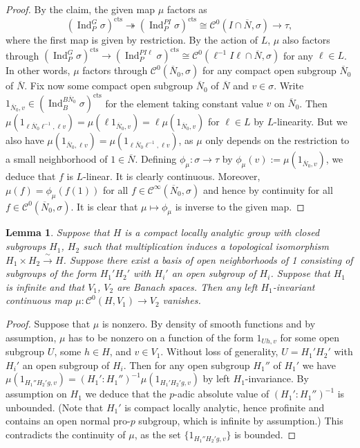 \documentclass[a4paper]{amsart}
\numberwithin{equation}{section}
\newtheorem{lem}[thm]{Lemma}
\theoremstyle{remark}
\theoremstyle{definition}
\DeclareMathOperator{\Ind}{Ind}
\newcommand{\cts}{\mathrm{cts}}
\newcommand{\congto}{\xrightarrow{\,\sim\,}}
\newcommand{\onto}{\twoheadrightarrow}
\renewcommand{\simeq}{\cong}
\begin{document}
\begin{proof}
  By the claim, the given map $\mu$ factors as
  \begin{equation*}
    (\Ind_{P}^G\sigma)^{\cts} \onto (\Ind_{P}^{P I}\sigma)^{\cts} \cong \mathcal C^0(I \cap \overline{N}, \sigma) \to \tau,
  \end{equation*}
  where the first map is given by restriction.
  By the action of $L$, $\mu$ also factors through $(\Ind_{P}^{G}\sigma)^{\cts}\to (\Ind_{P}^{PI\ell}\sigma)^{\cts}\simeq \mathcal{C}^{0}(\ell^{-1}I\ell\cap \overline{N},\sigma)$ for any $\ell\in L$.
  In other words, $\mu$ factors through $\mathcal C^0(\overline{N}_0, \sigma)$ for any compact open subgroup $\overline{N}_0$ of $\overline{N}$.
  Fix now some compact open subgroup $\overline{N}_0$ of $\overline{N}$ and $v \in \sigma$.
  Write $1_{\overline{N}_0,v} \in (\Ind_B^{B \overline{N}_0}\sigma)^{\cts}$ for the element taking constant value $v$ on $\overline{N}_0$.
  Then $\mu(1_{\ell \overline{N}_0 \ell^{-1},\ell v}) = \mu(\ell 1_{\overline{N}_0,v}) = \ell\mu(1_{\overline{N}_0,v})$ for $\ell\in L$ by $L$-linearity.
  But we also have $\mu(1_{\overline{N}_0,\ell v}) = \mu(1_{\ell \overline{N}_0 \ell^{-1},\ell v})$, as $\mu$ only depends on the restriction to a small neighborhood of $1 \in \overline{N}$.
  Defining $\phi_\mu : \sigma \to \tau$ by $\phi_\mu(v) := \mu(1_{\overline{N}_0,v})$, we deduce that $f$ is $L$-linear.
  It is clearly continuous.
  Moreover, $\mu(f) = \phi_\mu(f(1))$ for all $f \in \mathcal C^\infty(\overline{N}_0, \sigma)$ and hence by continuity for all $f \in \mathcal C^0(\overline{N}_0, \sigma)$.
  It is clear that $\mu \mapsto \phi_\mu$ is inverse to the given map.
\end{proof}

\begin{lem}\label{lem:no-haar}
  Suppose that $H$ is a compact locally analytic group with closed subgroups $H_1$, $H_2$ such that multiplication induces a topological isomorphism $H_1 \times H_2 \congto H$.
  Suppose there exist a basis of open neighborhoods of 1 consisting of subgroups of the form $H_1'H_2'$ with $H_i'$ an open subgroup of $H_i$.
  Suppose that $H_1$ is infinite and that $V_1$, $V_2$ are Banach spaces.
  Then any left $H_1$-invariant continuous map $\mu\colon \mathcal C^0(H,V_1) \to V_2$ vanishes.
\end{lem}

\begin{proof}
  Suppose that $\mu$ is nonzero.
  By density of smooth functions and by assumption, $\mu$ has to be nonzero on a function of the form $1_{Uh,v}$ for some open subgroup $U$, some $h \in H$, and $v \in V_1$.
  Without loss of generality, $U = H_1'H_2'$ with $H_i'$ an open subgroup of $H_i$.
  Then for any open subgroup $H_1''$ of $H_1'$ we have $\mu(1_{H_1''H_2'g,v}) = (H_1':H_1'')^{-1}\mu(1_{H_1'H_2'g,v})$ by left $H_1$-invariance.
  By assumption on $H_1$ we deduce that the $p$-adic absolute value of $(H_1':H_1'')^{-1}$ is unbounded.
  (Note that $H_1'$ is compact locally analytic, hence profinite and contains an open normal pro-$p$ subgroup, which is infinite by assumption.)
  This contradicts the continuity of $\mu$, as the set $\{1_{H_1''H_2'g,v}\}$ is bounded.
\end{proof}
\end{document}
